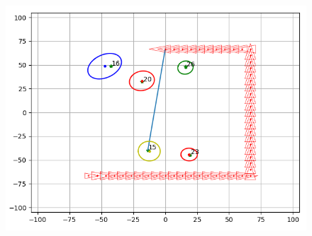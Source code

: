 \documentclass[11pt]{article}
\begin{document}
    
\begin{figure}
\centering
\includegraphics{4.png}
\end{figure}
\end{document}
